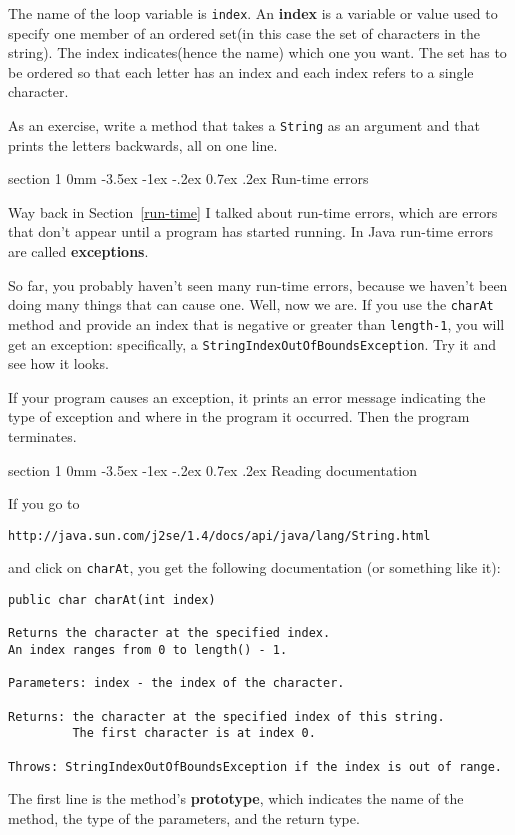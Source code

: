 \documentclass{book}
\makeatletter
\renewcommand{\section}{\@startsection 
    {section} {1} {0mm}%
    {-3.5ex \@plus -1ex \@minus -.2ex}%
    {0.7ex \@plus.2ex}%
    {\normalfont\Large\bfseries}}
\makeatother
\begin{document}

The name of the loop variable is {\tt index}.  An {\bf
index} is a variable or value used to specify one member of an ordered
set(in this case the set of characters in the string).  The index
indicates(hence the name) which one you want.  The set has to be
ordered so that each letter has an index and each index
refers to a single character.

As an exercise, write a method that takes a {\tt String}
as an argument and that prints the letters backwards, all on
one line.


\section{Run-time errors}

Way back in Section~\ref{run-time} I talked about run-time errors,
which are errors that don't appear until a program has started
running.  In Java run-time errors are called {\bf exceptions}.

So far, you probably haven't seen many run-time errors, because we
haven't been doing many things that can cause one.  Well, now we are.
If you use the {\tt charAt} method and provide an index that is
negative or greater than {\tt length-1}, you will get an exception:
specifically, a {\tt StringIndexOutOfBoundsException}.  Try it
and see how it looks.

If your program causes an exception, it prints an error message
indicating the type of exception and where in the program it
occurred.  Then the program terminates.


\section{Reading documentation}

If you go to

\begin{verbatim}
http://java.sun.com/j2se/1.4/docs/api/java/lang/String.html
\end{verbatim}
%
and click on {\tt charAt}, you get the following documentation
(or something like it):

\begin{verbatim}
public char charAt(int index)

Returns the character at the specified index.
An index ranges from 0 to length() - 1. 

Parameters: index - the index of the character. 

Returns: the character at the specified index of this string.
         The first character is at index 0. 

Throws: StringIndexOutOfBoundsException if the index is out of range.
\end{verbatim}
%
The first line is the method's {\bf prototype}, which indicates the
name of the method, the type of the parameters, and the return type.
\end{document}
